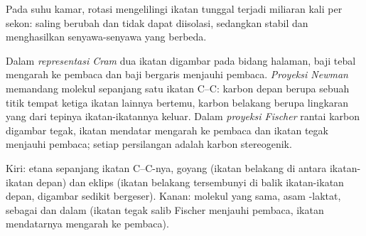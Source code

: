 Pada suhu kamar, rotasi mengelilingi ikatan tunggal terjadi miliaran kali
per sekon:  saling berubah dan tidak dapat
diisolasi, sedangkan  stabil dan menghasilkan senyawa-senyawa
yang berbeda.

\begin{definition}\label{def:b1:stereochemistry-in-depth:representations}
Dalam \emph{representasi Cram} dua ikatan
digambar pada bidang halaman, baji tebal mengarah ke pembaca dan baji
bergaris menjauhi pembaca. \emph{Proyeksi Newman}
memandang molekul sepanjang satu ikatan C--C: karbon depan berupa sebuah
titik tempat ketiga ikatan lainnya bertemu, karbon belakang berupa
lingkaran yang dari tepinya ikatan-ikatannya keluar. Dalam
\emph{proyeksi Fischer} rantai karbon digambar
tegak, ikatan mendatar mengarah ke pembaca dan ikatan tegak menjauhi
pembaca; setiap persilangan adalah karbon stereogenik.
\end{definition}

\begin{omfigure}

{\small Kiri:  etana sepanjang ikatan C--C-nya, goyang
(ikatan belakang di antara ikatan-ikatan depan) dan eklips (ikatan
belakang tersembunyi di balik ikatan-ikatan depan, digambar sedikit
bergeser). Kanan: molekul yang sama, asam -laktat, sebagai  dan dalam  (ikatan tegak salib Fischer
menjauhi pembaca, ikatan mendatarnya mengarah ke pembaca).}
\end{omfigure}

